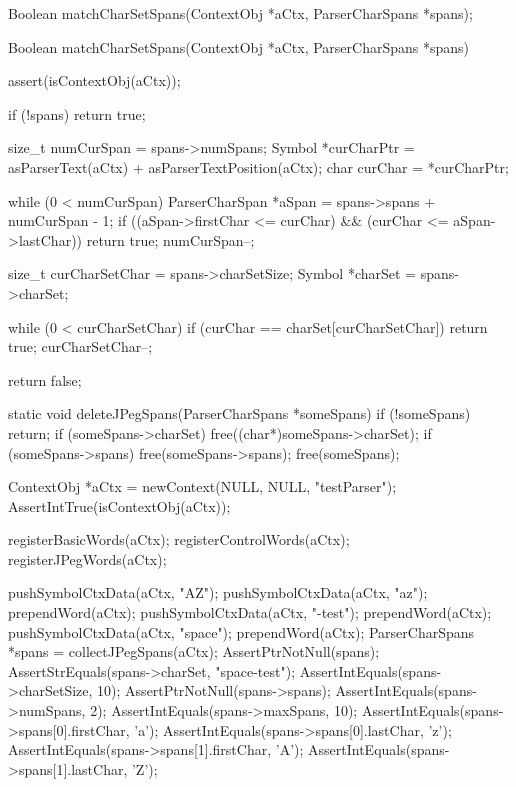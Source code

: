 \startCHeader
Boolean matchCharSetSpans(ContextObj *aCtx, ParserCharSpans *spans);
\stopCHeader

\startCCode
Boolean matchCharSetSpans(ContextObj *aCtx, ParserCharSpans *spans) {
  assert(isContextObj(aCtx));
  
  if (!spans) return true;
  
  size_t numCurSpan  = spans->numSpans;
  Symbol *curCharPtr = asParserText(aCtx) + asParserTextPosition(aCtx);
  char curChar       = *curCharPtr;
  
  while (0 < numCurSpan) {
    ParserCharSpan *aSpan = spans->spans + numCurSpan - 1;
    if ((aSpan->firstChar <= curChar) && (curChar <= aSpan->lastChar)) {
      return true;
    } 
    numCurSpan--;
  }
  
  size_t curCharSetChar = spans->charSetSize;
  Symbol *charSet       = spans->charSet;
  
  while (0 < curCharSetChar) {
    if (curChar == charSet[curCharSetChar]) {
      return true;
    }
    curCharSetChar--;
  }
  
  return false;
}

static void deleteJPegSpans(ParserCharSpans *someSpans) {
  if (!someSpans) return;
  if (someSpans->charSet) free((char*)someSpans->charSet);
  if (someSpans->spans)   free(someSpans->spans);
  free(someSpans);
}
\stopCCode


\startCTest
  ContextObj *aCtx = newContext(NULL, NULL, "testParser");
  AssertIntTrue(isContextObj(aCtx));
  
  registerBasicWords(aCtx);
  registerControlWords(aCtx);
  registerJPegWords(aCtx);
  
  pushSymbolCtxData(aCtx, "AZ");
  pushSymbolCtxData(aCtx, "az");
  prependWord(aCtx);
  pushSymbolCtxData(aCtx, "-test");
  prependWord(aCtx);
  pushSymbolCtxData(aCtx, "space");
  prependWord(aCtx);
  ParserCharSpans *spans = collectJPegSpans(aCtx);
  AssertPtrNotNull(spans);
  AssertStrEquals(spans->charSet, "space-test");
  AssertIntEquals(spans->charSetSize, 10);
  AssertPtrNotNull(spans->spans);
  AssertIntEquals(spans->numSpans, 2);
  AssertIntEquals(spans->maxSpans, 10);
  AssertIntEquals(spans->spans[0].firstChar, 'a');
  AssertIntEquals(spans->spans[0].lastChar,  'z');
  AssertIntEquals(spans->spans[1].firstChar, 'A');
  AssertIntEquals(spans->spans[1].lastChar,  'Z');
  

